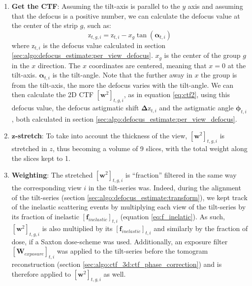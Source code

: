 \begin{enumerate}
    \item \textbf{Get the CTF}: Assuming the tilt-axis is parallel to the $y$ axis and assuming that the defocus is a positive number, we can calculate the defocus value at the center of the strip $g$, such as:
    \begin{equation}
        \bm{\mathrm{z}}_{t,g,i} = \bm{\mathrm{z}}_{t,i} - x_{g}\tan(\bm{\alpha}_{t,i})
    \end{equation}
    where $\bm{\mathrm{z}}_{t,i}$ is the defocus value calculated in section \ref{sec:algo:defocus_estimate:per_view_defocus}. $x_{g}$ is the center of the group $g$ in the $x$ direction. The $x$ coordinates are centered, meaning that $x=0$ at the tilt-axis. $\bm{\alpha}_{t,i}$ is the tilt-angle. Note that the further away in $x$ the group is from the tilt-axis, the more the defocus varies with the tilt-angle. We can then calculate the 2D CTF ${[\bm{w}^2]}_{t,g,i}$, as in equation \ref{eq:ctf2}, using this defocus value, the defocus astigmatic shift $\bm{\Delta \mathrm{z}}_{t,i}$ and the astigmatic angle $\bm{\phi}_{t,i}$, both calculated in section \ref{sec:algo:defocus_estimate:per_view_defocus}.

    \item \textbf{$\bm{z}$-stretch}: To take into account the thickness of the view, ${[\bm{w}^2]}_{t,g,i}$ is stretched in $z$, thus becoming a volume of 9 slices, with the total weight along the slices kept to 1.

    \item \textbf{Weighting}: The stretched ${[\bm{w}^2]}_{t,g,i}$ is ``fraction'' filtered in the same way the corresponding view $i$ in the tilt-series was. Indeed, during the alignment of the tilt-series (section \ref{sec:algo:defocus_estimate:transform}), we kept track of the inelastic scattering events by multiplying each view of the tilt-series by its fraction of inelastic ${[\bm{f}_{inelastic}]}_{t,i}$ (equation \ref{eq:f_inelatic}). As such, ${[\bm{w}^2]}_{t,g,i}$ is also multiplied by its ${[\bm{f}_{inelastic}]}_{t,i}$ and similarly by the fraction of dose, if a Saxton dose-scheme was used. Additionally, an exposure filter ${[\bm{W}_{exposure}]}_{t,i}$ was applied to the tilt-series before the tomogram reconstruction (section \ref{sec:algo:ctf_3d:ctf_phase_correction}) and is therefore applied to ${[\bm{w}^2]}_{t,g,i}$ as well.


\end{enumerate}
